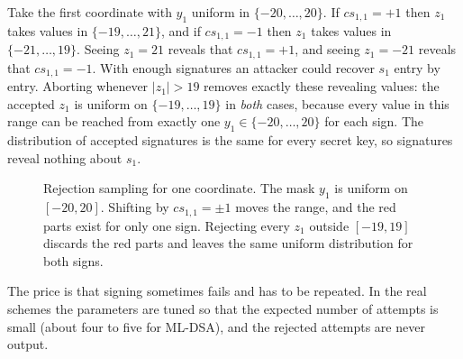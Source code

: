 \documentclass[11pt,a4paper]{article}
\theoremstyle{definition}
\begin{document}
Take the first coordinate with $y_1$ uniform in $\{-20,\dots,20\}$. If $c s_{1,1}=+1$ then $z_1$ takes values in $\{-19,\dots,21\}$, and if $cs_{1,1}=-1$ then $z_1$ takes values in $\{-21,\dots,19\}$. Seeing $z_1=21$ reveals that $cs_{1,1}=+1$, and seeing $z_1=-21$ reveals that $cs_{1,1}=-1$. With enough signatures an attacker could recover $s_1$ entry by entry. Aborting whenever $|z_1|>19$ removes exactly these revealing values: the accepted $z_1$ is uniform on $\{-19,\dots,19\}$ in \emph{both} cases, because every value in this range can be reached from exactly one $y_1\in\{-20,\dots,20\}$ for each sign. The distribution of accepted signatures is the same for every secret key, so signatures reveal nothing about $s_1$.

\begin{figure}[h]
\centering
{}
\caption{Rejection sampling for one coordinate. The mask $y_1$ is uniform on $[-20,20]$. Shifting by $cs_{1,1}=\pm1$ moves the range, and the red parts exist for only one sign. Rejecting every $z_1$ outside $[-19,19]$ discards the red parts and leaves the same uniform distribution for both signs.}
\end{figure}

The price is that signing sometimes fails and has to be repeated. In the real schemes the parameters are tuned so that the expected number of attempts is small (about four to five for ML-DSA), and the rejected attempts are never output.
\end{document}
